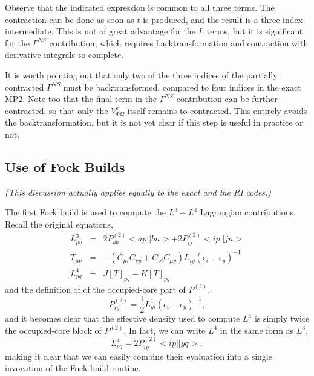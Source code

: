 \documentclass[fleqn,12pt]{article}
\newcommand{\half}{\frac{1}{2}}
\newcommand{\bra}{<\!}
\newcommand{\ket}{\!>}
\newcommand{\Ptwo}{P^{(2)}}
\begin{document}
\begin{changebar}
Observe that the indicated expression is common to all three terms.
The contraction can be done as soon as $t$ is produced, and the result
is a three-index intermediate.  This is not of great advantage for the
$L$ terms, but it is significant for the $\Gamma^{NS}$ contribution,
which requires backtransformation and contraction with derivative
integrals to complete.

It is worth pointing out that only two of the three indices of the
partially contracted $\Gamma^{NS}$ must be backtransformed, compared
to four indices in the exact MP2.  Note too that the final term in the
$\Gamma^{NS}$ contribution can be further contracted, so that only the
$V^{x}_{\Phi\Omega}$ itself remains to contracted.  This entirely
avoids the backtransformation, but it is not yet clear if this step is
useful in practice or not.

\end{changebar}

\subsection{Use of Fock Builds}

{\em (This discussion actually applies equally to the exact and the RI
codes.) }

The first Fock build is used to compute the $L^{3} + L^{4}$ Lagrangian
contributions.  Recall the original equations,
\begin{eqnarray}
  L^3_{pn} & = & 2 \Ptwo_{ab} \bra ap || bn \ket + 2 \Ptwo_{ij} \bra ip
  || jn \ket \\
  T_{\mu \nu} & = & - \left(C_{\mu i} C_{\nu y} + C_{\nu i} C_{\mu y}
  \right) L_{iy} \left( \epsilon_i - \epsilon_y \right)^{-1} \\
   L^4_{pq} & = & J[T]_{pq} - K[T]_{pq}
\end{eqnarray}
and the definition of of the occupied-core part of $P^{(2)}$, 
\begin{equation}
  \Ptwo_{iy} = \half L^1_{yi} \left( \epsilon_i -  \epsilon_y  \right)^{-1},
\end{equation}
and it becomes clear that the effective density used to compute
$L^{4}$ is simply twice the occupied-core block of $\Ptwo$.  In fact,
we can write $L^{4}$ in the same form as $L^{3}$, 
\begin{equation}
  L^4_{pq} = 2 \Ptwo_{iy} \bra ip || yq \ket ,
\end{equation}
making it clear that we can easily combine their evaluation into a
single invocation of the Fock-build routine.
\end{document}
